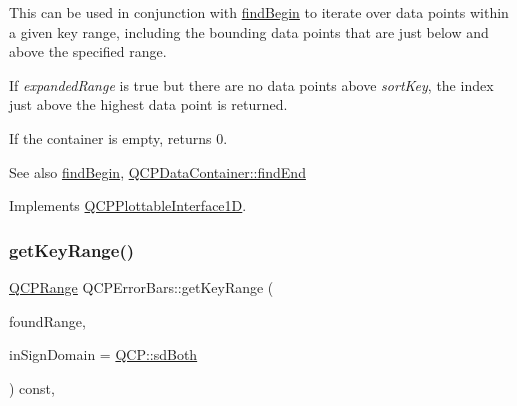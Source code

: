 This can be used in conjunction with \hyperlink{classQCPErrorBars_a74c57d6abb8eda3c4c31b72d1df9f568}{find\+Begin} to iterate over data points within a given key range, including the bounding data points that are just below and above the specified range.

If {\itshape expanded\+Range} is true but there are no data points above {\itshape sort\+Key}, the index just above the highest data point is returned.

If the container is empty, returns 0.

\begin{DoxySeeAlso}{See also}
\hyperlink{classQCPErrorBars_a74c57d6abb8eda3c4c31b72d1df9f568}{find\+Begin}, \hyperlink{classQCPDataContainer_afb8b8f23cc2b7234a793a25ce79fe48f}{Q\+C\+P\+Data\+Container\+::find\+End} 
\end{DoxySeeAlso}


Implements \hyperlink{classQCPPlottableInterface1D_a5deced1016bc55a41a2339619045b295}{Q\+C\+P\+Plottable\+Interface1D}.

\mbox{\label{classQCPErrorBars_a6cac828a430d66ac77a167549d01d212}} 
\subsubsection{\texorpdfstring{get\+Key\+Range()}{getKeyRange()}}
{\footnotesize\ttfamily \hyperlink{classQCPRange}{Q\+C\+P\+Range} Q\+C\+P\+Error\+Bars\+::get\+Key\+Range (\begin{DoxyParamCaption}\item[{bool \&}]{found\+Range,  }\item[{\hyperlink{namespaceQCP_afd50e7cf431af385614987d8553ff8a9}{Q\+C\+P\+::\+Sign\+Domain}}]{in\+Sign\+Domain = {\ttfamily \hyperlink{namespaceQCP_afd50e7cf431af385614987d8553ff8a9aa38352ef02d51ddfa4399d9551566e24}{Q\+C\+P\+::sd\+Both}} }\end{DoxyParamCaption}) const\hspace{0.3cm}{\ttfamily [protected]}, {\ttfamily [virtual]}}

